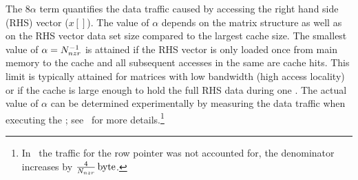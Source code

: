 The $8\alpha$ term quantifies the data traffic caused by accessing the right hand side (RHS) vector ($x[]$). The value of $\alpha$ depends on the matrix structure as well as on the RHS vector data set size compared to the largest cache size. The smallest value of $\alpha=N_{nzr}^{-1}$ is attained if the RHS vector is only loaded once from main memory to the cache and all subsequent accesses in the same \SpMV are cache hits. This limit is typically attained for matrices with low bandwidth (high access locality) or if the cache is large enough to hold the full RHS data during one \SpMV. The actual value of $\alpha$ can be determined experimentally by measuring the data traffic when executing the \SpMV; see~\cite{Moritz_sell} for more details.\footnote{In~\cite{Moritz_sell} the traffic for the row pointer was not accounted for, \ie the denominator increases by $\frac{4}{N_{nzr}}\,\mbox{byte}$.}

\begin{comment}
\subsubsection{\SpMTV}
Sparse Matrix Transpose Vector (\SpMTV) is a kernel having \DTWO dependency.
\begin{algorithm}[H]
	\caption{SpMTV Find $b$ : $b=A'x$} 
	\label{alg:SpMTV}
	\begin{algorithmic}[1]
		\FOR{$row=1:nrows$}
		\FOR{$idx=rowPtr[row]:rowPtr[row+1]$}
		\STATE{$b[col[idx]] += A[idx]*x[row]$} 
		\ENDFOR
		\ENDFOR
	\end{algorithmic}
\end{algorithm}
In comparison to SpMV operation, the kernel requires an extra scatter operation, which causes dependency. The arithmetic intensity of the kernel $I_\mathrm{\SpMTV}$ is given as:
\begin{equation}
\label{eq:SpMTV_intensity}
I_\mathrm{\SpMTV} (\alpha)= \frac{2}{8+4+16*\alpha+\frac{8}{\NNZRmath}} \\
\end{equation}
In ideal case data traffic for this kernel should remain close to that of SpMV, if \NNZR are sufficiently high, and $\alpha$ factor is small enough.
\end{comment}

